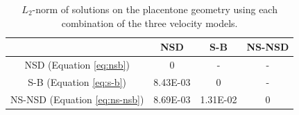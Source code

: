     \begin{table}[]
        \centering
        \begin{tabular}{c|ccc}
              & NSD & S-B & NS-NSD \\
             \hline
             NSD (Equation \eqref{eq:nsb}) & \num{0} & - & - \\
             S-B (Equation \eqref{eq:s-b}) & \num{8.43E-03} & \num{0} & - \\ 
             NS-NSD (Equation \eqref{eq:ns-nsb}) & \num{8.69E-03} & \num{1.31E-02} & \num{0} 
        \end{tabular}
        \caption{$L_2$-norm of solutions on the placentone geometry using each combination of the three velocity models.}
        \label{tab:4-models-placentone-l2}
    \end{table}